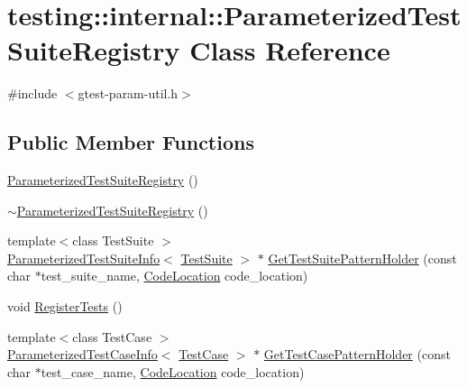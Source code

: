 \hypertarget{classtesting_1_1internal_1_1_parameterized_test_suite_registry}{}\section{testing\+::internal\+::Parameterized\+Test\+Suite\+Registry Class Reference}
\label{classtesting_1_1internal_1_1_parameterized_test_suite_registry}


{\ttfamily \#include $<$gtest-\/param-\/util.\+h$>$}

\subsection*{Public Member Functions}
\begin{DoxyCompactItemize}
\item 
\mbox{\hyperlink{classtesting_1_1internal_1_1_parameterized_test_suite_registry_ae3827c085ed16faaa9197486513292c0}{Parameterized\+Test\+Suite\+Registry}} ()
\item 
\mbox{\hyperlink{classtesting_1_1internal_1_1_parameterized_test_suite_registry_ab29f7a321883945d7f86f3292c100eb5}{$\sim$\+Parameterized\+Test\+Suite\+Registry}} ()
\item 
{\footnotesize template$<$class Test\+Suite $>$ }\\\mbox{\hyperlink{classtesting_1_1internal_1_1_parameterized_test_suite_info}{Parameterized\+Test\+Suite\+Info}}$<$ \mbox{\hyperlink{classtesting_1_1_test_suite}{Test\+Suite}} $>$ $\ast$ \mbox{\hyperlink{classtesting_1_1internal_1_1_parameterized_test_suite_registry_a89ef6dd228f4188e1928513e860580d0}{Get\+Test\+Suite\+Pattern\+Holder}} (const char $\ast$test\+\_\+suite\+\_\+name, \mbox{\hyperlink{structtesting_1_1internal_1_1_code_location}{Code\+Location}} code\+\_\+location)
\item 
void \mbox{\hyperlink{classtesting_1_1internal_1_1_parameterized_test_suite_registry_a44c2ee0296de42dc6ca7abbf48d00495}{Register\+Tests}} ()
\item 
{\footnotesize template$<$class Test\+Case $>$ }\\\mbox{\hyperlink{classtesting_1_1internal_1_1_parameterized_test_case_info}{Parameterized\+Test\+Case\+Info}}$<$ \mbox{\hyperlink{classtesting_1_1_test_case}{Test\+Case}} $>$ $\ast$ \mbox{\hyperlink{classtesting_1_1internal_1_1_parameterized_test_suite_registry_a3fe06fb4e1b4194dae1fbcdf3560fbd3}{Get\+Test\+Case\+Pattern\+Holder}} (const char $\ast$test\+\_\+case\+\_\+name, \mbox{\hyperlink{structtesting_1_1internal_1_1_code_location}{Code\+Location}} code\+\_\+location)

\end{DoxyCompactItemize}
